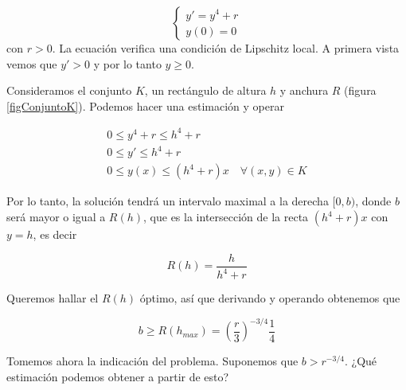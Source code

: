 \documentclass{mathnotes}
\begin{document}
\begin{example}
\[ \begin{cases}
y' = y^4 + r \\
y(0) = 0
\end{cases}
\] 
con $r>0$. La ecuación verifica una condición de Lipschitz local. A primera vista vemos que $y'>0$ y por lo tanto $y≥0$.

Consideramos el conjunto $K$, un rectángulo de altura $h$ y anchura $R$ (figura \ref{figConjuntoK}). Podemos hacer una estimación y operar

\begin{gather*}
0 ≤ y^4 + r ≤ h^4 + r \\
0 ≤ y' ≤ h^4 + r \\
0 ≤ y(x) ≤ (h^4+r)x \quad ∀(x,y) ∈ K
\end{gather*}

Por lo tanto, la solución tendrá un intervalo maximal a la derecha $[0,b)$, donde $b$ será mayor o igual a $R(h)$, que es la intersección de la recta $(h^4+r)x$ con $y=h$, es decir

\[ R(h) = \frac{h}{h^4+r} \]

Queremos hallar el $R(h)$ óptimo, así que derivando y operando obtenemos que

\[ b ≥ R(h_{max}) = \left(\frac{r}{3}\right)^{-3/4} \frac{1}{4} \]

Tomemos ahora la indicación del problema. Suponemos que $b>r^{-3/4}$. ¿Qué estimación podemos obtener a partir de esto? 
\end{example}
\end{document}
